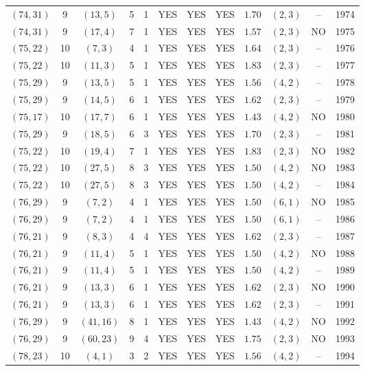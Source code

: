 \begin{longtable}{|c|c|c|c|c|c|c|c|c|c|c|c|}
$(74,31)$ & 9 & $(13,5)$ & 5 & 1 & YES & YES & YES & $1.70$ & $(2,3)$ & -- & 1974\\
$(74,31)$ & 9 & $(17,4)$ & 7 & 1 & YES & YES & YES & $1.57$ & $(2,3)$ & NO & 1975\\
$(75,22)$ & 10 & $(7,3)$ & 4 & 1 & YES & YES & YES & $1.64$ & $(2,3)$ & -- & 1976\\
$(75,22)$ & 10 & $(11,3)$ & 5 & 1 & YES & YES & YES & $1.83$ & $(2,3)$ & -- & 1977\\
$(75,29)$ & 9 & $(13,5)$ & 5 & 1 & YES & YES & YES & $1.56$ & $(4,2)$ & -- & 1978\\
$(75,29)$ & 9 & $(14,5)$ & 6 & 1 & YES & YES & YES & $1.62$ & $(2,3)$ & -- & 1979\\
$(75,17)$ & 10 & $(17,7)$ & 6 & 1 & YES & YES & YES & $1.43$ & $(4,2)$ & NO & 1980\\
$(75,29)$ & 9 & $(18,5)$ & 6 & 3 & YES & YES & YES & $1.70$ & $(2,3)$ & -- & 1981\\
$(75,22)$ & 10 & $(19,4)$ & 7 & 1 & YES & YES & YES & $1.83$ & $(2,3)$ & NO & 1982\\
$(75,22)$ & 10 & $(27,5)$ & 8 & 3 & YES & YES & YES & $1.50$ & $(4,2)$ & NO & 1983\\
$(75,22)$ & 10 & $(27,5)$ & 8 & 3 & YES & YES & YES & $1.50$ & $(4,2)$ & -- & 1984\\
$(76,29)$ & 9 & $(7,2)$ & 4 & 1 & YES & YES & YES & $1.50$ & $(6,1)$ & NO & 1985\\
$(76,29)$ & 9 & $(7,2)$ & 4 & 1 & YES & YES & YES & $1.50$ & $(6,1)$ & -- & 1986\\
$(76,21)$ & 9 & $(8,3)$ & 4 & 4 & YES & YES & YES & $1.62$ & $(2,3)$ & -- & 1987\\
$(76,21)$ & 9 & $(11,4)$ & 5 & 1 & YES & YES & YES & $1.50$ & $(4,2)$ & NO & 1988\\
$(76,21)$ & 9 & $(11,4)$ & 5 & 1 & YES & YES & YES & $1.50$ & $(4,2)$ & -- & 1989\\
$(76,21)$ & 9 & $(13,3)$ & 6 & 1 & YES & YES & YES & $1.62$ & $(2,3)$ & NO & 1990\\
$(76,21)$ & 9 & $(13,3)$ & 6 & 1 & YES & YES & YES & $1.62$ & $(2,3)$ & -- & 1991\\
$(76,29)$ & 9 & $(41,16)$ & 8 & 1 & YES & YES & YES & $1.43$ & $(4,2)$ & NO & 1992\\
$(76,29)$ & 9 & $(60,23)$ & 9 & 4 & YES & YES & YES & $1.75$ & $(2,3)$ & NO & 1993\\
$(78,23)$ & 10 & $(4,1)$ & 3 & 2 & YES & YES & YES & $1.56$ & $(4,2)$ & -- & 1994\\

\end{longtable}
